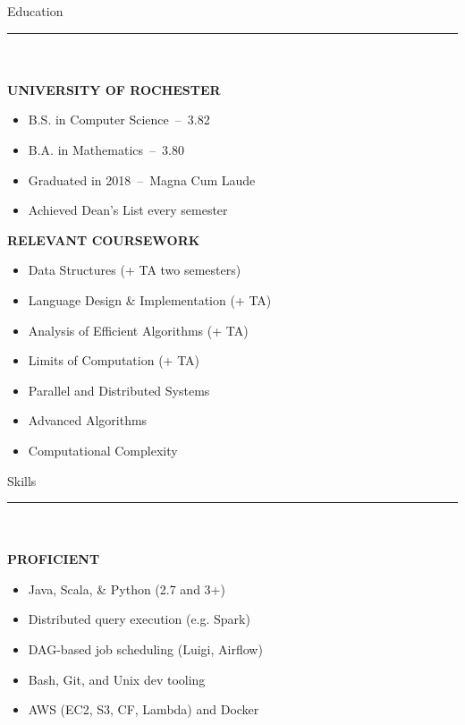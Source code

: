 \documentclass[letterpaper]{article}
\makeatletter
\newcommand{\fillbox}[1]{\resizebox{\textwidth}{!}{\begin{tabular}{@{}l@{}} #1 \end{tabular}}}
\makeatother
\begin{document}
	\noindent{}\noindent
	\begin{bgbox}[height=\paperheight, colback=gray!15, width=0.38\textwidth, left=0.12in, right=0.11in]
		\vspace*{-4pt}
		\fillbox{\thin Brandon\\[-6pt] \thin Willett}\vspace*{12pt}
		{\Huge{Education}}\\[-6pt]
		\noindent\rule{\textwidth}{1pt}\\ \\
		\textbf{UNIVERSITY OF ROCHESTER}
		\begin{itemize} [noitemsep,topsep=4pt]
			\item B.S. in Computer Science \,--\, 3.82
			\item B.A. in Mathematics \,--\, 3.80
			\item Graduated in 2018 \,--\, Magna Cum Laude
			\item Achieved Dean's List every semester
		\end{itemize}
		\vspace*{12pt}
		\textbf{RELEVANT COURSEWORK}
		\begin{itemize} [noitemsep,topsep=4pt]
			\item Data Structures (+ TA two semesters)
			\item Language Design \& Implementation (+ TA)
			\item Analysis of Efficient Algorithms (+ TA)
			\item Limits of Computation (+ TA)
			\item Parallel and Distributed Systems
			\item Advanced Algorithms
			\item Computational Complexity
		\end{itemize}
		\vspace*{24pt}
		{\Huge{Skills}}\\[-6pt]
		\noindent\rule{\textwidth}{1pt}\\ \\
		\textbf{PROFICIENT}
		\begin{itemize} [noitemsep,topsep=4pt]
			\item Java, Scala, \& Python (2.7 and 3+)
			\item Distributed query execution (e.g. Spark)
			\item DAG-based job scheduling (Luigi, Airflow)
			\item Bash, Git, and Unix dev tooling
			\item AWS (EC2, S3, CF, Lambda) and Docker

\end{itemize}
\end{bgbox}
\end{document}
